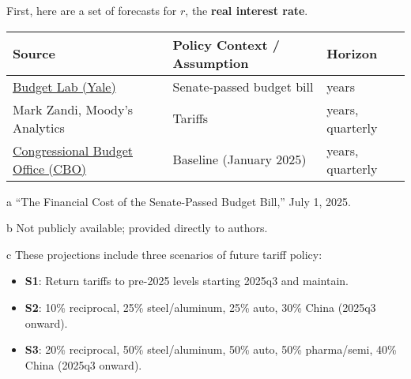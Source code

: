 \documentclass{article}
\begin{document}
First, here are a set of forecasts for $r$, the \textbf{real interest rate}. 
\begin{center}
\begin{threeparttable}
\begin{tabularx}{\textwidth}{>{\centering\arraybackslash}X >{\centering\arraybackslash}X >{\centering\arraybackslash}X}
  \textbf{Source} & \textbf{Policy Context / Assumption} & \textbf{Horizon} \\ \hline\hline
  \href{https://budgetlab.yale.edu/research/financial-cost-senate-passed-budget-bill}{Budget Lab (Yale)\tnote{a}} & Senate-passed budget bill & 30 years \\
  Mark Zandi, Moody's Analytics\tnote{b} & Tariffs\tnote{c} & 4 years, quarterly \\
  \href{https://www.cbo.gov/data/budget-economic-data\#3}{Congressional Budget Office (CBO)} & Baseline (January 2025) & 10 years, quarterly \\
\end{tabularx}

\vspace{1ex}
\begin{tablenotes}
\footnotesize
\item[a] “The Financial Cost of the Senate-Passed Budget Bill,” July 1, 2025.
\item[b] Not publicly available; provided directly to authors.
\item[c] These projections include three scenarios of future tariff policy:
\begin{itemize}
  \item \textbf{S1}: Return tariffs to pre-2025 levels starting 2025q3 and maintain.
  \item \textbf{S2}: 10\% reciprocal, 25\% steel/aluminum, 25\% auto, 30\% China (2025q3 onward).
  \item \textbf{S3}: 20\% reciprocal, 50\% steel/aluminum, 50\% auto, 50\% pharma/semi, 40\% China (2025q3 onward).
\end{itemize}
\end{tablenotes}
\end{threeparttable}
\end{center}
\vspace{0.15in}
\end{document}
